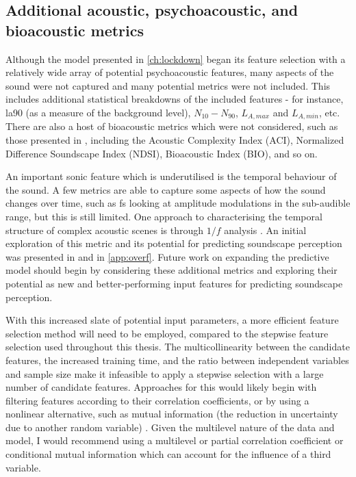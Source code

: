 \subsection{Additional acoustic, psychoacoustic, and bioacoustic metrics}

Although the model presented in \cref{ch:lockdown} began its feature selection with a relatively wide array of potential psychoacoustic features, many aspects of the sound were not captured and many potential metrics were not included. This includes additional statistical breakdowns of the included features - for instance, \gls{la90} (as a measure of the background level), $N_{10} - N_{90}$, $L_{A,max}$ and $L_{A,min}$, etc. There are also a host of bioacoustic metrics which were not considered, such as those presented in \citet{Devos2016Soundecology}, including the Acoustic Complexity Index (ACI), Normalized Difference Soundscape Index (NDSI), Bioacoustic Index (BIO), and so on.

An important sonic feature which is underutilised is the temporal behaviour of the sound. A few metrics are able to capture some aspects of how the sound changes over time, such as \gls{fs} looking at amplitude modulations in the sub-audible range, but this is still limited. One approach to characterising the temporal structure of complex acoustic scenes is through $1/f$ analysis \citep{deCoensel20031f,deCoensel2006quiet,Yang2015Presence}. An initial exploration of this metric and its potential for predicting soundscape perception was presented in \citet{Mitchell2019spectral} and in \cref{app:overf}. Future work on expanding the predictive model should begin by considering these additional metrics and exploring their potential as new and better-performing input features for predicting soundscape perception.

With this increased slate of potential input parameters, a more efficient feature selection method will need to be employed, compared to the stepwise feature selection used throughout this thesis. The multicollinearity between the candidate features, the increased training time, and the ratio between independent variables and sample size make it infeasible to apply a stepwise selection with a large number of candidate features. Approaches for this would likely begin with filtering features according to their correlation coefficients, or by using a nonlinear alternative, such as mutual information (the reduction in uncertainty due to another random variable) \citep{Cover1991}. Given the multilevel nature of the data and model, I would recommend using a multilevel or partial correlation coefficient \citep{Baba2004Partial} or conditional mutual information \citep{Fleuret2004Fast} which can account for the influence of a third variable. 

